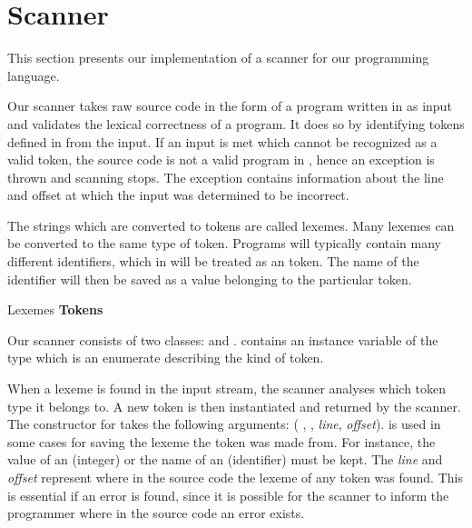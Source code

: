 \section{Scanner}
\label{sec:scannerimplementation}
This section presents our implementation of a scanner for our programming language.

Our scanner takes raw source code in the form of a program written in
\productname{} as input and validates the lexical correctness of a
\productname{} program. It does so by identifying
tokens defined in \productname{} from the input. If an input is met
which cannot be recognized as a valid token, the source code is not
a valid program in \productname{}, hence an exception is thrown and
scanning stops. The exception contains information about the line and
offset at which the input was determined to be incorrect.

The strings which are converted to tokens are called lexemes. Many
lexemes can be converted to the same type of token. Programs will
typically contain many different identifiers, which in \productname{}
will be treated as an  token. The name of the identifier will
then be saved as a value belonging to the particular token.

                 {		     }
       {Lexemes	}{\textbf{Tokens}    }{
\tabrow{$[$    	}{ LBRACKET	     }
\tabrow{$]$	}{ RBRACKET 	     }
}

Our scanner consists of two classes:  and
.  contains an instance variable of the 
type  which is an enumerate describing the kind of token.

When a lexeme is found in the input stream, the scanner analyses which
token type it belongs to. A new token is then instantiated and returned
by the scanner. The constructor for  takes the following
arguments: ( ,  ,  \textit{line},  \textit{offset}). 
 is used in some cases for saving the lexeme the token was made from. For instance, the value of an  (integer) or the name of an  (identifier) must be kept. The \textit{line} and \textit{offset} represent where in the source code the
lexeme of any token was found. This is essential if an error is found,
since it is possible for the scanner to inform the programmer where in
the source code an error exists.

